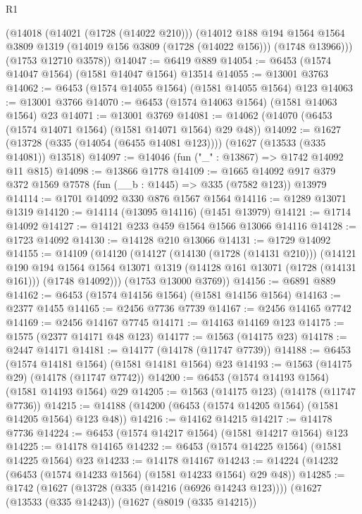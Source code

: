 \begin{lexlean}{R1}
\begin{coremodule}
      (@14018
        (@14021 (@1728 (@14022 @210)))
        (@14012
          @188
          @194
          @1564
          @1564
          @3809
          @1319
          (@14019 @156 @3809 (@1728 (@14022 @156)))
          (@1748 @13966)))
      (@1753 @12710 @3578))
@14047 := @6419 @889
@14054 := @6453 (@1574 @14047 @1564) (@1581 @14047 @1564) @13514
@14055 := @13001 @3763
@14062 := @6453 (@1574 @14055 @1564) (@1581 @14055 @1564) @123
@14063 := @13001 @3766
@14070 := @6453 (@1574 @14063 @1564) (@1581 @14063 @1564) @23
@14071 := @13001 @3769
@14081 := @14062 (@14070 (@6453 (@1574 @14071 @1564) (@1581 @14071 @1564) @29 @48))
@14092 := @1627 (@13728 (@335 (@14054 (@6455 @14081 @123)))) (@1627 (@13533 (@335 @14081)) @13518)
@14097 := @14046 (fun ("_" : @13867) => @1742 @14092 @11 @815)
@14098 := @13866 @1778
@14109 := @1665 @14092 @917 @379 @372 @1569 @7578 (fun (__b : @1445) => @335 (@7582 @123)) @13979
@14114 := @1701 @14092 @330 @876 @1567 @1564
@14116 := @1289 @13071 @1319
@14120 := @14114 (@13095 @14116) (@1451 @13979)
@14121 := @1714 @14092
@14127 := @14121 @233 @459 @1564 @1566 @13066 @14116
@14128 := @1723 @14092
@14130 := @14128 @210 @13066
@14131 := @1729 @14092
@14155 := @14109
    (@14120
      (@14127
        (@14130 (@1728 (@14131 @210)))
        (@14121
          @190
          @194
          @1564
          @1564
          @13071
          @1319
          (@14128 @161 @13071 (@1728 (@14131 @161)))
          (@1748 @14092)))
      (@1753 @13000 @3769))
@14156 := @6891 @889
@14162 := @6453 (@1574 @14156 @1564) (@1581 @14156 @1564)
@14163 := @2377 @1455
@14165 := @2456 @7736 @7739
@14167 := @2456 @14165 @7742
@14169 := @2456 @14167 @7745
@14171 := @14163 @14169 @123
@14175 := @1575 (@2377 @14171 @48 @123)
@14177 := @1563 (@14175 @23)
@14178 := @2447 @14171
@14181 := @14177 (@14178 (@11747 @7739))
@14188 := @6453 (@1574 @14181 @1564) (@1581 @14181 @1564) @23
@14193 := @1563 (@14175 @29) (@14178 (@11747 @7742))
@14200 := @6453 (@1574 @14193 @1564) (@1581 @14193 @1564) @29
@14205 := @1563 (@14175 @123) (@14178 (@11747 @7736))
@14215 := @14188 (@14200 (@6453 (@1574 @14205 @1564) (@1581 @14205 @1564) @123 @48))
@14216 := @14162 @14215
@14217 := @14178 @7736
@14224 := @6453 (@1574 @14217 @1564) (@1581 @14217 @1564) @123
@14225 := @14178 @14165
@14232 := @6453 (@1574 @14225 @1564) (@1581 @14225 @1564) @23
@14233 := @14178 @14167
@14243 := @14224 (@14232 (@6453 (@1574 @14233 @1564) (@1581 @14233 @1564) @29 @48))
@14285 := @1742
    (@1627
      (@13728 (@335 (@14216 (@6926 @14243 @123))))
      (@1627
        (@13533 (@335 @14243))
        (@1627
          (@8019 (@335 @14215))

\end{coremodule}
\end{lexlean}

